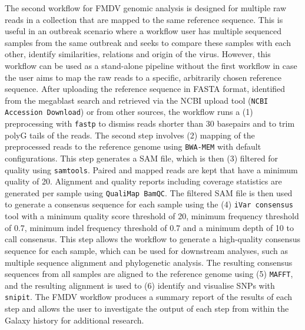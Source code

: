The second workflow for \ac{FMDV} genomic analysis is designed for multiple raw reads in a collection that are mapped to the same reference sequence. This is useful in an outbreak scenario where a workflow user has multiple sequenced samples from the same outbreak and seeks to compare these samples with each other, identify similarities, relations and origin of the virus. However, this workflow can be used as a stand-alone pipeline without the first workflow in case the user aims to map the raw reads to a specific, arbitrarily chosen reference sequence. After uploading the reference sequence in FASTA format, identified from the megablast search and retrieved via the \ac{NCBI} upload tool (\texttt{NCBI Accession Download}) or from other sources, the workflow runs a (1) preprocessing with \texttt{fastp} to dismiss reads shorter than 30 basepairs and to trim polyG tails of the reads. The second step involves (2) mapping of the preprocessed reads to the reference genome using \texttt{BWA-MEM} with default configurations. This step generates a \ac{SAM} file, which is then (3) filtered for quality using \texttt{samtools}. Paired and mapped reads are kept that have a minimum quality of 20. Alignment and quality reports including coverage statistics are generated per sample using \texttt{QualiMap BamQC}. The filtered \ac{SAM} file is then used to generate a consensus sequence for each sample using the (4) \texttt{iVar consensus} tool with a minimum quality score threshold of 20, minimum frequency threshold of 0.7, minimum indel frequency threshold of 0.7 and a minimum depth of 10 to call consensus. This step allows the workflow to generate a high-quality consensus sequence for each sample, which can be used for downstream analyses, such as multiple sequence alignment and phylogenetic analysis. The resulting consensus sequences from all samples are aligned to the reference genome using (5) \texttt{MAFFT}, and the resulting alignment is used to (6) identify and visualise \acs{SNP}s with \texttt{snipit}. The \ac{FMDV} workflow produces a summary report of the results of each step and allows the user to investigate the output of each step from within the Galaxy history for additional research. 
